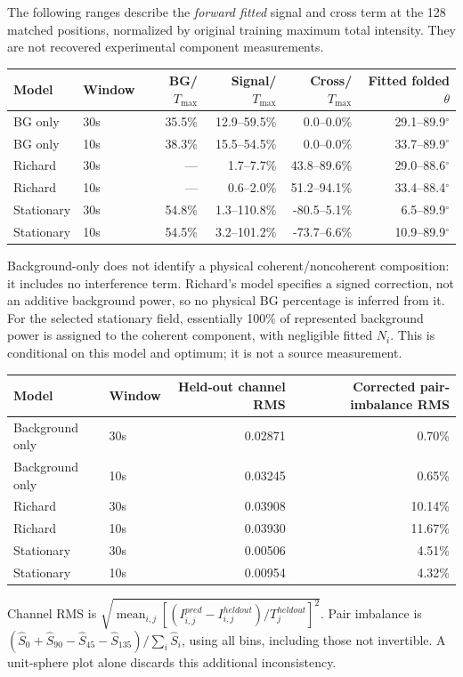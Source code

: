 \documentclass[10pt,a4paper]{article}
\begin{document}
The following ranges describe the \emph{forward fitted} signal and cross term at the 128 matched positions, normalized by original training maximum total intensity. They are not recovered experimental component measurements.

\begin{tabular}{llrrrr}\toprule
Model & Window & BG/\(T_{\max}\) & Signal/\(T_{\max}\) & Cross/\(T_{\max}\) & Fitted folded \(\theta\)\\\midrule
BG only & 30s & 35.5\% & 12.9--59.5\% & 0.0--0.0\% & 29.1--89.9$^\circ$ \\
BG only & 10s & 38.3\% & 15.5--54.5\% & 0.0--0.0\% & 33.7--89.9$^\circ$ \\
Richard & 30s & --- & 1.7--7.7\% & 43.8--89.6\% & 29.0--88.6$^\circ$ \\
Richard & 10s & --- & 0.6--2.0\% & 51.2--94.1\% & 33.4--88.4$^\circ$ \\
Stationary & 30s & 54.8\% & 1.3--110.8\% & -80.5--5.1\% & 6.5--89.9$^\circ$ \\
Stationary & 10s & 54.5\% & 3.2--101.2\% & -73.7--6.6\% & 10.9--89.9$^\circ$ \\
\bottomrule\end{tabular}

Background-only does not identify a physical coherent/noncoherent composition: it includes no interference term. Richard's model specifies a signed correction, not an additive background power, so no physical BG percentage is inferred from it. For the selected stationary field, essentially 100\% of represented background power is assigned to the coherent component, with negligible fitted $N_i$. This is conditional on this model and optimum; it is not a source measurement.

\begin{tabular}{llrr}\toprule
Model & Window & Held-out channel RMS & Corrected pair-imbalance RMS\\\midrule
Background only & 30s & 0.02871 & 0.70\% \\
Background only & 10s & 0.03245 & 0.65\% \\
Richard & 30s & 0.03908 & 10.14\% \\
Richard & 10s & 0.03930 & 11.67\% \\
Stationary & 30s & 0.00506 & 4.51\% \\
Stationary & 10s & 0.00954 & 4.32\% \\
\bottomrule\end{tabular}

Channel RMS is $\sqrt{\operatorname{mean}_{i,j}[(I^{pred}_{i,j}-I^{heldout}_{i,j})/T^{heldout}_j]^2}$. Pair imbalance is $(\widehat S_0+\widehat S_{90}-\widehat S_{45}-\widehat S_{135})/\sum_i\widehat S_i$, using all bins, including those not invertible. A unit-sphere plot alone discards this additional inconsistency.
\end{document}
